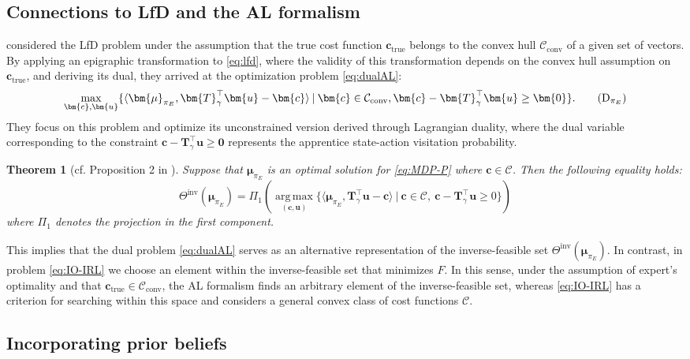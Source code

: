 \documentclass[10pt]{article} %
\newtheorem{theorem}{Theorem}
\def\C{\ensuremath{\mathcal{C}}}
\def\mTg{{\bm{T}}_\gamma}
\def\vzero{{\bm{0}}}
\def\vc{{\bm{c}}}
\def\vu{{\bm{u}}}
\def\vmu{{\bm{\mu}}}
\DeclareMathOperator*{\argmax}{arg\,max}
\begin{document}
\subsection{Connections to LfD and the AL formalism} \label{sec:Lfd-AL}
\cite{Kamoutsi2021} considered the LfD problem under the assumption that the true cost function $\vc_{\text{true}}$ belongs to the convex hull $\C_{\text{conv}}$ of a given set of vectors. By applying an epigraphic transformation to \eqref{eq:lfd}, where the validity of this transformation depends on the convex hull assumption on $\vc_{\text{true}}$, and deriving its dual, they arrived at the optimization problem \eqref{eq:dualAL}:
\begin{align*}
    \max_{\vc, \vu} \{ \langle \vmu_{\pi_E}, \mTg^\top \vu - \vc \rangle \: | \: \vc\in\C_{\text{conv}}, \vc - \mTg^\top \vu \geq \vzero\}. \tag{$\text{D}_{\pi_E}$} \label{eq:dualAL}
\end{align*}
They focus on this problem and optimize its unconstrained version derived through Lagrangian duality, where the dual variable corresponding to the constraint $\vc - \mTg^\top \vu \geq \vzero$ represents the apprentice state-action visitation probability.
\begin{theorem}[cf. Proposition 2 in \cite{Kamoutsi2021}]\label{theorem:IO-IRL}
    Suppose that $\vmu_{\pi_E}$ is an optimal solution for \eqref{eq:MDP-P} where $\vc \in \C$. Then the following equality holds:
    $$\Theta^{\text{inv}}(\vmu_{\pi_E}) = \Pi_1\left( \argmax\limits_{(\vc,\vu)} \{ \langle \vmu_{\pi_E}, \mTg^\top \vu - \vc \rangle \: | \: \vc \in \C, \: \vc - \mTg^\top\vu \geq 0 \}\right)$$
    where $\Pi_1$ denotes the projection in the first component.
\end{theorem}

This implies that the dual problem \eqref{eq:dualAL} serves as an alternative representation of the inverse-feasible set $\Theta^{\text{inv}}(\vmu_{\pi_E})$. In contrast, in problem \eqref{eq:IO-IRL} we choose an element within the inverse-feasible set that minimizes $F$. In this sense, under the assumption of expert's optimality and that $\vc_{\text{true}} \in \C_{\text{conv}}$, the AL formalism finds an arbitrary element of the inverse-feasible set, whereas \eqref{eq:IO-IRL} has a criterion for searching within this space and considers a general convex class of cost functions $\C$.

\subsection{Incorporating prior beliefs}
\end{document}
